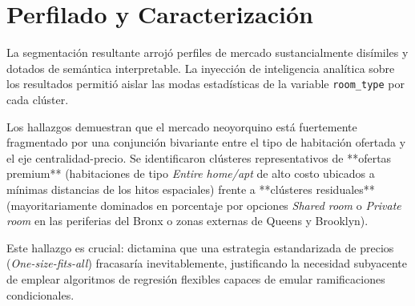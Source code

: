 \section{Perfilado y Caracterización}
La segmentación resultante arrojó perfiles de mercado sustancialmente disímiles y dotados de semántica interpretable. La inyección de inteligencia analítica sobre los resultados permitió aislar las modas estadísticas de la variable \texttt{room\_type} por cada clúster. 

Los hallazgos demuestran que el mercado neoyorquino está fuertemente fragmentado por una conjunción bivariante entre el tipo de habitación ofertada y el eje centralidad-precio. Se identificaron clústeres representativos de **ofertas premium** (habitaciones de tipo \textit{Entire home/apt} de alto costo ubicados a mínimas distancias de los hitos espaciales) frente a **clústeres residuales** (mayoritariamente dominados en porcentaje por opciones \textit{Shared room} o \textit{Private room} en las periferias del Bronx o zonas externas de Queens y Brooklyn). 

Este hallazgo es crucial: dictamina que una estrategia estandarizada de precios (\textit{One-size-fits-all}) fracasaría inevitablemente, justificando la necesidad subyacente de emplear algoritmos de regresión flexibles capaces de emular ramificaciones condicionales.
